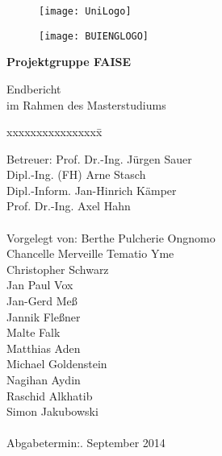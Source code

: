 \begin{titlepage}
  \begin{centering}
  \begin{figure}[h!]
    \centering
    \texttt{[image: UniLogo]}
  \end{figure}

  \vspace*{-0.8cm}

  \begin{figure}[h!]
    \centering
    \texttt{[image: BUIENGLOGO]}
  \end{figure}

  \vspace*{0.4cm}
  
  \textsf{\Huge \textbf{Projektgruppe FAISE\\}}

  \vspace*{0.5cm}
  \noindent Endbericht\\
  im Rahmen des Masterstudiums

  \end{centering}
  
  \vspace*{1.5cm}
  \begin{tabbing}
  xxxxxxxxxxxxxxxx\= \kill
  
  \small Betreuer: \>Prof. Dr.-Ing. Jürgen Sauer\\
  \small \>Dipl.-Ing. (FH) Arne Stasch\\
  \small \>Dipl.-Inform. Jan-Hinrich Kämper\\
  \small \>Prof. Dr.-Ing. Axel Hahn\\\\

  \small Vorgelegt von: \>Berthe Pulcherie Ongnomo\\
  \small \>Chancelle Merveille Tematio Yme\\
  \small \>Christopher Schwarz\\
  \small \>Jan Paul Vox\\
  \small \>Jan-Gerd Meß\\
  \small \>Jannik Fleßner\\
  \small \>Malte Falk\\
  \small \>Matthias Aden\\
  \small \>Michael Goldenstein\\
  \small \>Nagihan Aydin\\
  \small \>Raschid Alkhatib\\
  \small \>Simon Jakubowski\\\\

  \small Abgabetermin:. September 2014
  \end{tabbing}
\end{titlepage}
